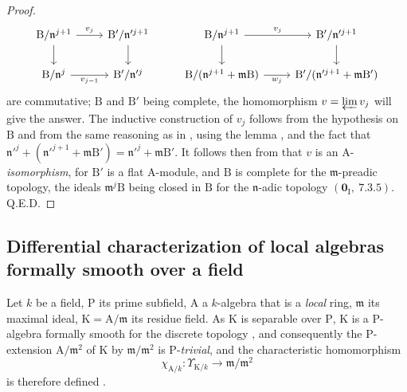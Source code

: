 \begin{proof}
\[
  \begin{tikzcd}
    \mathrm{B}/\mathfrak{n}^{j+1} \ar[r,"v_j"] \ar[d] & \mathrm{B}'/\mathfrak{n}'^{j+1} \ar[d] & \mathrm{B}/\mathfrak{n}^{j+1} \ar[r,"v_j"] \ar[d] & \mathrm{B}'/\mathfrak{n}'^{j+1} \ar[d]\\
    \mathrm{B}/\mathfrak{n}^j \ar[r,"v_{j-1}"'] & \mathrm{B}'/\mathfrak{n}'^j & \mathrm{B}/(\mathfrak{n}^{j+1}+\mathfrak{m}\mathrm{B}) \ar[r,"w_j"'] & \mathrm{B}'/(\mathfrak{n}'^{j+1}+\mathfrak{m}\mathrm{B}')
  \end{tikzcd}
\]
are commutative; $\mathrm{B}$ and $\mathrm{B}'$ being complete, the homomorphism $v=\varprojlim v_j$ will give the answer. The inductive construction of $v_j$ follows from the hypothesis on $\mathrm{B}$ and from
the same reasoning as in , using the lemma , and the fact that $\mathfrak{n}'^j+(\mathfrak{n}'^{j+1}+\mathfrak{m}\mathrm{B}')=\mathfrak{n}'^j+\mathfrak{m}\mathrm{B}'$.
It follows then from  that $v$ is an $\mathrm{A}$-\emph{isomorphism}, for $\mathrm{B}'$ is a flat $\mathrm{A}$-module, and $\mathrm{B}$ is complete for the $\mathfrak{m}$-preadic topology, the ideals $\mathfrak{m}^j\mathrm{B}$ being closed in $\mathrm{B}$ for the $\mathfrak{n}$-adic topology $(\mathbf{0}_\mathrm{I},~7.3.5)$.
\hfill Q.E.D.
\end{proof}

\subsection{Differential characterization of local algebras formally smooth over a field}
\label{subsection:0.22.2}

\begin{env}[22.2.1]
\label{0.22.2.1}
Let $k$ be a field, $\mathrm{P}$ its prime subfield, $\mathrm{A}$ a $k$-algebra that is a \emph{local} ring, $\mathfrak{m}$ its maximal ideal, $\mathrm{K}=\mathrm{A}/\mathfrak{m}$ its residue field.
As $\mathrm{K}$ is separable over $\mathrm{P}$, $\mathrm{K}$ is a $\mathrm{P}$-algebra formally smooth for the discrete topology , and consequently the $\mathrm{P}$-extension $\mathrm{A}/\mathfrak{m}^2$ of $\mathrm{K}$ by $\mathfrak{m}/\mathfrak{m}^2$ is $\mathrm{P}$-\emph{trivial}, and the characteristic homomorphism
\[
\label{0.22.2.1.1}
  \chi_{\mathrm{A}/k}:\Upsilon_{\mathrm{K}/k}\to\mathfrak{m}/\mathfrak{m}^2
  \tag{22.2.1.1}
\]
is therefore defined .
\end{env}

